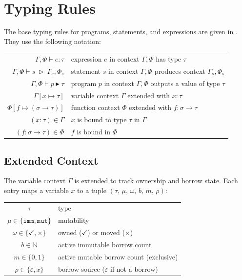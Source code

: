 \section{Typing Rules}

The base typing rules for programs, statements, and expressions are given in
.
They use the following notation:

\vspace{1em}
\begin{tabular}{r | l}
    $\Gamma,\Phi \vdash e : \tau$
      & expression $e$ in context $\Gamma,\Phi$ has type $\tau$ \\
    $\Gamma,\Phi \vdash s\ \triangleright\ \Gamma_s,\Phi_s$
      & statement $s$ in context $\Gamma,\Phi$ produces context $\Gamma_s,\Phi_s$ \\
    $\Gamma,\Phi \vdash p \blacktriangleright \tau$
      & program $p$ in context $\Gamma,\Phi$ outputs a value of type $\tau$ \\
    $\Gamma[x \mapsto \tau]$
      & variable context $\Gamma$ extended with $x : \tau$ \\
    $\Phi[f \mapsto (\sigma \to \tau)]$
      & function context $\Phi$ extended with $f : \sigma \to \tau$ \\
    $(x : \tau) \in \Gamma$
      & $x$ is bound to type $\tau$ in $\Gamma$ \\
    $(f : \sigma \to \tau) \in \Phi$
      & $f$ is bound in $\Phi$ \\
\end{tabular}






\subsection*{Extended Context}

The variable context $\Gamma$ is extended to track ownership and borrow state.
Each entry maps a variable $x$ to a tuple $(\tau,\,\mu,\,\omega,\,b,\,m,\,\rho)$:

\vspace{0.5em}
\begin{tabular}{c | l}
    $\tau$   & type \\
    $\mu \in \{\mathtt{imm},\mathtt{mut}\}$  & mutability \\
    $\omega \in \{\checkmark, \times\}$ & owned ($\checkmark$) or moved ($\times$) \\
    $b \in \mathbb{N}$ & active immutable borrow count \\
    $m \in \{0,1\}$   & active mutable borrow count (exclusive) \\
    $\rho \in \{\varepsilon, x\}$ & borrow source ($\varepsilon$ if not a borrow) \\
\end{tabular}
\vspace{0.5em}

